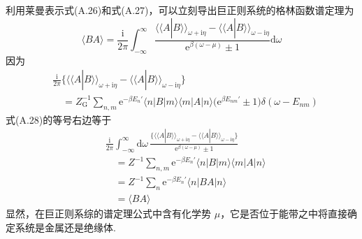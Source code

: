 利用莱曼表示式(A.26)和式(A.27)，可以立刻导出巨正则系统的格林函数谱定理为
\begin{equation}
\langle BA\rangle=\frac{\mathrm{i}}{2\pi}\int_{-\infty}^{\infty}
\frac{\langle\langle A|B\rangle\rangle_{\omega+\mathrm{i}\eta}
-\langle\langle A|B\rangle\rangle_{\omega-\mathrm{i}\eta}}
{\mathrm{e}^{\beta(\omega-\mu)}\pm1}\mathrm{d}\omega
\end{equation}
因为
\begin{equation}
\begin{aligned}
&\frac{\mathrm{i}}{2\pi}\bigl\{\langle\langle A|B\rangle\rangle_{\omega+\mathrm{i}\eta}
-\langle\langle A|B\rangle\rangle_{\omega-\mathrm{i}\eta}\bigr\}\\
&\quad=Z_{\mathrm{G}}^{-1}\sum_{n,m}\mathrm{e}^{-\beta E_{n}'}
\langle n|B|m\rangle\langle m|A|n\rangle
\bigl(\mathrm{e}^{\beta E_{nm}'}\pm1\bigr)\delta(\omega-E_{nm})
\end{aligned}
\end{equation}
式(A.28)的等号右边等于
\begin{equation*}
\begin{aligned}
&\frac{\mathrm{i}}{2\pi}\int_{-\infty}^{\infty}\mathrm{d}\omega\,
\frac{\bigl\{\langle\langle A|B\rangle\rangle_{\omega+\mathrm{i}\eta}
-\langle\langle A|B\rangle\rangle_{\omega-\mathrm{i}\eta}\bigr\}}
{\mathrm{e}^{\beta(\omega-\mu)}\pm1}\\
&\quad=Z^{-1}\sum_{n,m}\mathrm{e}^{-\beta E_{n}'}
\langle n|B|m\rangle\langle m|A|n\rangle\\
&\quad=Z^{-1}\sum_{n}\mathrm{e}^{-\beta E_{n}'}\langle n|BA|n\rangle\\
&\quad=\langle BA\rangle
\end{aligned}
\end{equation*}
显然，在巨正则系综的谱定理公式中含有化学势 $\mu$，它是否位于能带之中将直接确定系统是金属还是绝缘体.

